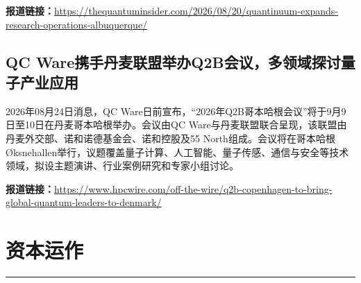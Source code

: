 \documentclass[12pt,a4paper]{ctexart}
\begin{document}
\noindent\textbf{报道链接：}\url{https://thequantuminsider.com/2026/08/20/quantinuum-expands-research-operations-albuquerque/}

\subsection{ QC Ware携手丹麦联盟举办Q2B会议，多领域探讨量子产业应用 }

2026年08月24日消息，QC Ware日前宣布，“2026年Q2B哥本哈根会议”将于9月9日至10日在丹麦哥本哈根举办。会议由QC Ware与丹麦联盟联合呈现，该联盟由丹麦外交部、诺和诺德基金会、诺和控股及55 North组成。会议将在哥本哈根Øksnehallen举行，议题覆盖量子计算、人工智能、量子传感、通信与安全等技术领域，拟设主题演讲、行业案例研究和专家小组讨论。

\noindent\textbf{报道链接：}\url{https://www.hpcwire.com/off-the-wire/q2b-copenhagen-to-bring-global-quantum-leaders-to-denmark/}


\newpage
\section{资本运作}
\vspace{-0.5em}
\noindent\rule{\linewidth}{1.5pt}
\end{document}
